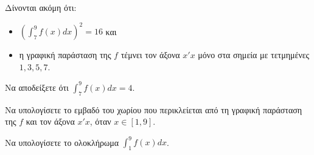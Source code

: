 Δίνονται ακόμη ότι:
\begin{itemize}
    \item $\left(\int_7^9 f(x)dx\right)^2 = 16$ και
    \item η γραφική παράσταση της $f$ τέμνει τον άξονα $x'x$ μόνο στα σημεία με τετμημένες $1, 3, 5, 7$.
\end{itemize}
\begin{alist}
    \item Να αποδείξετε ότι $\int_7^9 f(x)dx = 4$. 
    \item Να υπολογίσετε το εμβαδό του χωρίου που περικλείεται από τη γραφική παράσταση της $f$ και τον άξονα $x'x$, όταν $x\in[1,9]$. 
    \item Να υπολογίσετε το ολοκλήρωμα $\int_1^9 f(x)dx$. 
\end{alist}